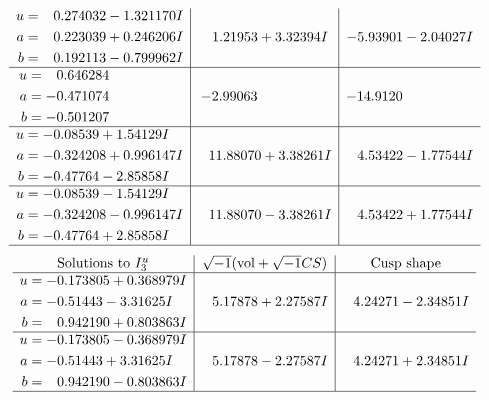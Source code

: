 \documentclass[1p]{elsarticle_modified}
\theoremstyle{definition}
\newcommand{\I}{\sqrt{-1}}
\begin{document}
$$\begin{array}{c|c|c}
\begin{aligned}
u &= \phantom{-}0.274032 - 1.321170 I \\
a &= \phantom{-}0.223039 + 0.246206 I \\
b &= \phantom{-}0.192113 - 0.799962 I\end{aligned}
 & \phantom{-}1.21953 + 3.32394 I & -5.93901 - 2.04027 I \\ \hline\begin{aligned}
u &= \phantom{-}0.646284\phantom{ +0.000000I} \\
a &= -0.471074\phantom{ +0.000000I} \\
b &= -0.501207\phantom{ +0.000000I}\end{aligned}
 & -2.99063\phantom{ +0.000000I} & -14.9120\phantom{ +0.000000I} \\ \hline\begin{aligned}
u &= -0.08539 + 1.54129 I \\
a &= -0.324208 + 0.996147 I \\
b &= -0.47764 - 2.85858 I\end{aligned}
 & \phantom{-}11.88070 + 3.38261 I & \phantom{-}4.53422 - 1.77544 I \\ \hline\begin{aligned}
u &= -0.08539 - 1.54129 I \\
a &= -0.324208 - 0.996147 I \\
b &= -0.47764 + 2.85858 I\end{aligned}
 & \phantom{-}11.88070 - 3.38261 I & \phantom{-}4.53422 + 1.77544 I\\
 \hline 
 \end{array}$$\newpage$$\begin{array}{c|c|c}  
\text{Solutions to }I^u_{3}& \I (\text{vol} + \sqrt{-1}CS) & \text{Cusp shape}\\
 \hline 
\begin{aligned}
u &= -0.173805 + 0.368979 I \\
a &= -0.51443 - 3.31625 I \\
b &= \phantom{-}0.942190 + 0.803863 I\end{aligned}
 & \phantom{-}5.17878 + 2.27587 I & \phantom{-}4.24271 - 2.34851 I \\ \hline\begin{aligned}
u &= -0.173805 - 0.368979 I \\
a &= -0.51443 + 3.31625 I \\
b &= \phantom{-}0.942190 - 0.803863 I\end{aligned}
 & \phantom{-}5.17878 - 2.27587 I & \phantom{-}4.24271 + 2.34851 I\\
 \hline 
 \end{array}$$\newpage
\end{document}
